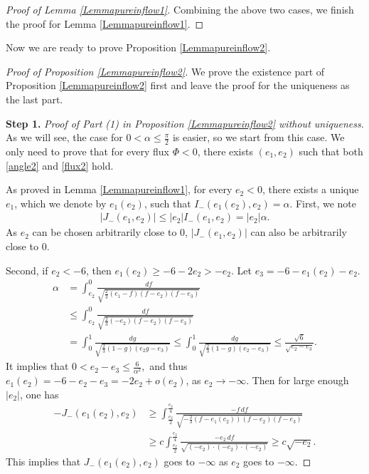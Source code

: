 \documentclass[reqno,12pt]{amsart}
\begin{document}
\begin{proof}[Proof of Lemma \ref{Lemmapureinflow1}]
Combining the above two cases, we finish the proof for Lemma \ref{Lemmapureinflow1}.
\end{proof}


Now we are ready to prove Proposition \ref{Lemmapureinflow2}.
\begin{proof}[Proof of Proposition \ref{Lemmapureinflow2}]
We prove the existence part of  Proposition \ref{Lemmapureinflow2} first and leave the proof for the uniqueness as the last part.

{\bf Step 1.} {\it Proof of Part (1) in Proposition \ref{Lemmapureinflow2} without uniqueness}. 
 As we will see, the case for $0< \alpha \leq \frac{\pi}{2}$ is easier, so we start from this case. We only need to prove that for every flux $\Phi<0$, there exists $(e_1, e_2)$ such that  both \eqref{angle2}  and \eqref{flux2} hold. 

As proved in Lemma \ref{Lemmapureinflow1}, for every $e_2<0$, there exists a unique $e_1$, which we denote by $e_1(e_2)$, such that $I_{-}(e_1(e_2), e_2) = \alpha$. 
First, we note
\begin{align}
\label{eq:j-}
  \left|  J_{-}(e_1, e_2) \right| \leq |e_2| I_{-}(e_1, e_2) = |e_2| \alpha. 
\end{align}
As $e_2$ can be chosen arbitrarily close to $0$, $|J_{-}(e_1, e_2)|$ can also be arbitrarily close to $0$. 

Second, if $e_2<-6$, then $e_1(e_2) \geq -6 -2e_2 > -e_2. $ Let $e_3 = -6-e_1(e_2) - e_2$. 
\begin{align} \nonumber
    \alpha & = \int_{e_2}^0 \frac{df}{\sqrt{\frac23 (e_1-f) (f-e_2) (f-e_3)}} \\ \nonumber
    & \leq  \int_{e_2}^0 \frac{df}{\sqrt{\frac23 (-e_2) (f-e_2) (f-e_3)}}  \\ \nonumber
    & = \int_0^1 \frac{dg}{\sqrt{\frac23 (1- g) (e_2 g - e_3)}}\leq \int_0^1 \frac{dg}{\sqrt{\frac23 (1- g) (e_2  - e_3)}} \leq \frac{\sqrt{6}}{\sqrt{e_2 - e_3}}.  \nonumber
\end{align}
It implies that 
$
0<  e_2 - e_3 \leq \frac{6}{\alpha^2},
$
and thus $e_1(e_2) = -6 - e_2 - e_3 = -2e_2 + o(e_2)$, as $e_2 \to -\infty$. Then for large enough $|e_2|$, one has
\begin{align*}
-J_{-}(e_1(e_2), e_2) & \geq \int^{\frac{e_2}{4}}_{\frac{e_2}{2}} \frac{-f \, df }{\sqrt{-\frac23 (f- e_1(e_2))  (f-e_2) (f- e_3)}} \\
& \geq  c \int^{\frac{e_2}{4}}_{\frac{e_2}{2}} \frac{-e_2 \, df }{\sqrt{(-e_2)\cdot   (-e_2) \cdot  (-e_2) }} \geq c \sqrt{-e_2}.
\end{align*}
This implies that $J_{-}(e_1(e_2), e_2) $ goes to $-\infty$ as $e_2$ goes to $-\infty$. 


\end{proof}
\end{document}
